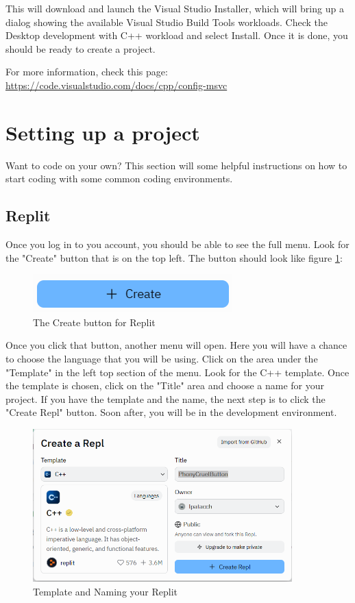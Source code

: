 This will download and launch the Visual Studio Installer, which will bring up a dialog showing the available Visual Studio Build Tools workloads. Check the Desktop development with C++ workload and select Install. Once it is done, you should be ready to create a project.

For more information, check this page:
\url{https://code.visualstudio.com/docs/cpp/config-msvc }

\section{Setting up a project}
\label{setupproject}
Want to code on your own? This section will some helpful instructions on
how to start coding with some common coding environments.
\subsection{Replit}
Once you log in to you account, you should be able to see the full
menu. Look for the "Create" button that is on the top left. The button
should look like figure \ref{fig:createreplit}:
\begin{figure}[h]
    \centering
    \includegraphics{images/CreateButtonReplit.PNG}
    \caption{The Create button for Replit}
    \label{fig:createreplit}
\end{figure}
Once you click that button, another menu will open. Here you will have a chance to choose the language
that you will be using. Click on the area under the "Template" in the left top section of the menu. Look for the C++ template. Once the template is chosen, click on the "Title" area and choose a name 
for your project. If you have the template and the name, the next step 
is to click the "Create Repl" button. Soon after, you will be in the
development environment.
\begin{figure}[h]
    \centering
    \includegraphics[width = 10cm]{images/createreplitmenu.PNG}
    \caption{Template and Naming your Replit}
    \label{fig:replitmenu}
\end{figure}


